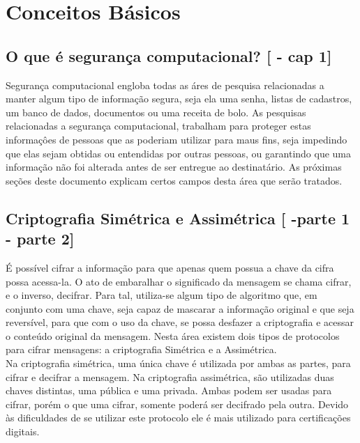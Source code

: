 \documentclass{article}
\begin{document}
	\section {Conceitos Básicos}
		\subsection{O que é segurança computacional? [\cite{STALLINS} - cap 1]}
			\begin{justify}
			
				\hspace{2cm} Segurança computacional engloba todas as áres de pesquisa relacionadas a manter algum tipo de informação segura, seja ela uma senha, listas de cadastros, um banco de dados, documentos ou uma receita de bolo. As pesquisas relacionadas a segurança computacional, trabalham para proteger estas informaçôes de pessoas que as poderiam utilizar para maus fins, seja impedindo que elas sejam obtidas ou entendidas por outras pessoas, ou garantindo que uma informação não foi alterada antes de ser entregue ao destinatário. As próximas seções deste documento explicam certos campos desta área que serão tratados.
			
			\end{justify}

		\subsection{Criptografia Simétrica e Assimétrica [\cite{STALLINS} -parte 1 - parte 2]}
			\begin{justify}
			

	 			\hspace{2cm} É possível cifrar a informação para que apenas quem possua a chave da cifra possa acessa-la. O ato de embaralhar o significado da mensagem se chama cifrar, e o inverso, decifrar. Para tal, utiliza-se algum tipo de algoritmo que, em conjunto com uma chave, seja capaz de mascarar a informação original e que seja reversível, para que com o uso da chave, se possa desfazer a criptografia e acessar o conteúdo original da mensagem. Nesta área existem dois tipos de protocolos para cifrar mensagens: a criptografia Simétrica e a Assimétrica. \\
				\hspace*{2cm}Na criptografia simétrica, uma única chave é utilizada por ambas as partes, para cifrar e decifrar a mensagem. Na criptografia assimétrica, são utilizadas duas chaves distintas, uma pública e uma privada. Ambas podem ser usadas para cifrar, porém o que uma cifrar, somente poderá ser decifrado pela outra. Devido às dificuldades de se utilizar este protocolo ele é mais utilizado para certificações digitais.
					
			\end{justify}
\end{document}
